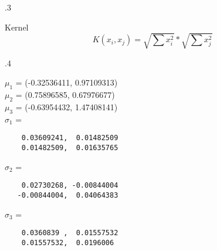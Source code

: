 \documentclass[12pt]{article}
\newenvironment{problem}[2][Problem]{\begin{trivlist}
\item[\hskip \labelsep {\bfseries #1}\hskip \labelsep {\bfseries #2.}]}{\end{trivlist}}
\begin{document}
\begin{problem} 4.3
\end{problem}
\begin{Answer}
Kernel 
\begin{equation}
K(x_{i}, x_{j}) = \sqrt{\sum x_{i}^2}  *  \sqrt{\sum x_{j}^2}
\end{equation}
\end{Answer}

\begin{problem} 4.4
\end{problem}
\begin{Answer}
$\mu_{1}$ = (-0.32536411,  0.97109313)\\
$\mu_{2}$ = (0.75896585,  0.67976677)\\
$\mu_{3}$ = (-0.63954432,  1.47408141)\\
$\sigma_{1}$ = 
\begin{verbatim}
    0.03609241,  0.01482509
    0.01482509,  0.01635765
\end{verbatim}

$\sigma_{2}$ = 
\begin{verbatim}
    0.02730268, -0.00844004
   -0.00844004,  0.04064383
\end{verbatim}

$\sigma_{3}$ = 
\begin{verbatim}
    0.0360839 ,  0.01557532
    0.01557532,  0.0196006
\end{verbatim}
\end{Answer}
\end{document}
